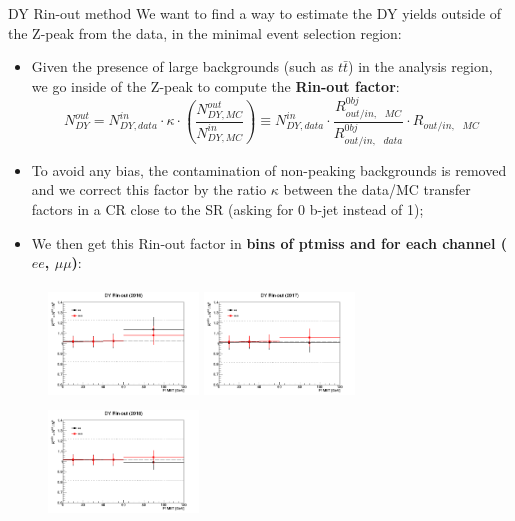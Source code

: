 \documentclass[8pt]{beamer}
\begin{document}
\begin{frame}{DY Rin-out method}
\justifying
We want to find a way to \alert{estimate the DY yields outside of the Z-peak from the data}, in the minimal event selection region:

\begin{itemize}
\justifying
\item Given the presence of large backgrounds (such as $t \bar t$) in the analysis region, we go inside of the Z-peak to compute the \textbf{Rin-out factor}:
\begin{equation*}
N^{out}_{DY} = N^{in}_{DY, data} \cdot \kappa \cdot \left (\frac{N^{out}_{DY, MC}}{N^{in}_{DY, MC}} \right ) \equiv N^{in}_{DY, data} \cdot \frac{R_{out/in,\text{ } MC}^{0bj}}{R_{out/in,\text{ } data}^{0bj}} \cdot R_{out/in,\text{ } MC}
\end{equation*}
\item To avoid any bias, the contamination of non-peaking backgrounds is removed and we correct this factor by the ratio $\kappa$ between the data/MC transfer factors in a CR close to the SR (asking for 0 b-jet instead of 1);
\item We then get this Rin-out factor in \textbf{bins of ptmiss and for each channel ($ee$, $\mu \mu$)}:
\end{itemize}

\begin{figure}[htbp]
\begin{center}
\begin{minipage}[b]{.32\textwidth}
\includegraphics[width=4cm, height=3cm]{figs/Rinout2016_data.png}
\end{minipage} \hfill
\begin{minipage}[b]{.32\textwidth}
\includegraphics[width=4cm, height=3cm]{figs/Rinout2017_data.png}
\end{minipage} \hfill
\begin{minipage}[b]{.32\textwidth}
\includegraphics[width=4cm, height=3cm]{figs/Rinout2018_data.png}
\end{minipage} \hfill
\end{center}
\end{figure} \vfill


\end{frame}
\end{document}

